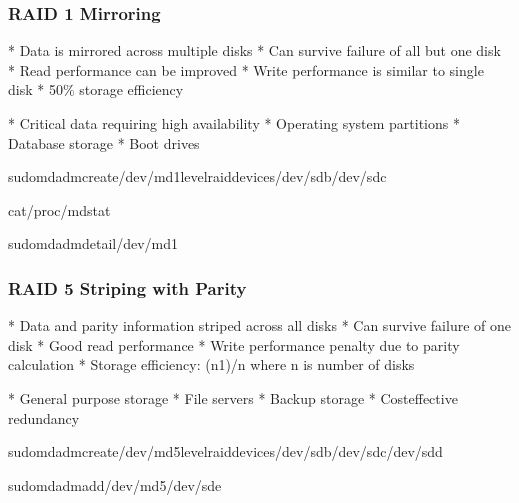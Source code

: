 \documentclass[letterpaper,10pt,english]{sphinxmanual}
\begin{document}
\subsubsection{RAID 1 \sphinxhyphen{} Mirroring}
\label{\detokenize{raid-systems:raid-1-mirroring}}
\sphinxAtStartPar
{}
* Data is mirrored across multiple disks
* Can survive failure of all but one disk
* Read performance can be improved
* Write performance is similar to single disk
* 50\% storage efficiency

\sphinxAtStartPar
{}
* Critical data requiring high availability
* Operating system partitions
* Database storage
* Boot drives

\begin{sphinxVerbatim}[commandchars=\\\{\}]
sudomdadm\PYGZhy{}\PYGZhy{}create/dev/md1\PYGZhy{}\PYGZhy{}level\PYGZhy{}\PYGZhy{}raid\PYGZhy{}devices/dev/sdb/dev/sdc

cat/proc/mdstat

sudomdadm\PYGZhy{}\PYGZhy{}detail/dev/md1
\end{sphinxVerbatim}


\subsubsection{RAID 5 \sphinxhyphen{} Striping with Parity}
\label{\detokenize{raid-systems:raid-5-striping-with-parity}}
\sphinxAtStartPar
{}
* Data and parity information striped across all disks
* Can survive failure of one disk
* Good read performance
* Write performance penalty due to parity calculation
* Storage efficiency: (n\sphinxhyphen{}1)/n where n is number of disks

\sphinxAtStartPar
{}
* General purpose storage
* File servers
* Backup storage
* Cost\sphinxhyphen{}effective redundancy

\begin{sphinxVerbatim}[commandchars=\\\{\}]
sudomdadm\PYGZhy{}\PYGZhy{}create/dev/md5\PYGZhy{}\PYGZhy{}level\PYGZhy{}\PYGZhy{}raid\PYGZhy{}devices/dev/sdb/dev/sdc/dev/sdd

sudomdadm\PYGZhy{}\PYGZhy{}add/dev/md5/dev/sde
\end{sphinxVerbatim}
\end{document}
